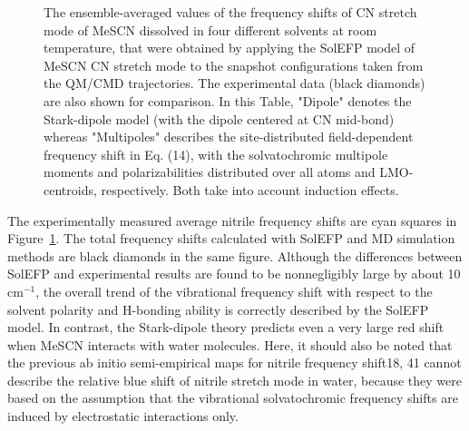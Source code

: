 \documentclass[a4paper,titlepage,twoside,fleqn,12pt]{book}
\begin{document}
\begin{refsection}
%
\begin{figure}[t!]
\centering
\setlength\fboxsep{0.4pt}
\setlength\fboxrule{0.5pt}
\caption{
The ensemble\hyp{}averaged values of the frequency shifts of CN stretch mode of MeSCN dissolved in four
different solvents at room temperature, that were obtained by applying the SolEFP model of MeSCN CN
stretch mode to the snapshot configurations taken from the QM/CMD trajectories. The experimental data (black
diamonds) are also shown for comparison. In this Table, "Dipole" denotes the Stark\hyp{}dipole model (with the
dipole centered at CN mid\hyp{}bond) whereas "Multipoles" describes the site\hyp{}distributed field\hyp{}dependent
frequency shift in Eq. (14), with the solvatochromic multipole moments and polarizabilities distributed over
all atoms and LMO\hyp{}centroids, respectively. Both take into account induction effects.
\label{t:mescn-solefp-md-exp}}
\end{figure}
%
The experimentally measured average nitrile frequency
shifts are cyan squares in Figure~\ref{t:mescn-solefp-md-exp}. 
The total frequency shifts
calculated with SolEFP and MD simulation methods are black
diamonds in the same figure. Although the differences
between SolEFP and experimental results are found to be nonnegligibly
large by about 10 cm$^{-1}$, the overall trend of the
vibrational frequency shift with respect to the solvent polarity
and H-bonding ability is correctly described by the SolEFP
model. In contrast, the Stark\hyp{}dipole theory predicts even a
very large red shift when MeSCN interacts with water
molecules. Here, it should also be noted that the previous ab
initio semi\hyp{}empirical maps for nitrile frequency shift18, 41
cannot describe the relative blue shift of nitrile stretch mode
in water, because they were based on the assumption that the
vibrational solvatochromic frequency shifts are induced by
electrostatic interactions only.


\end{refsection}
\end{document}
